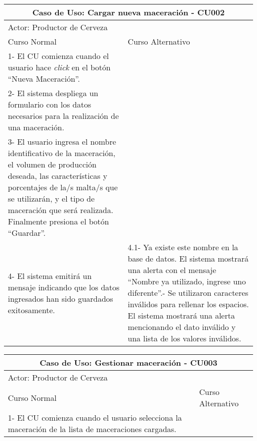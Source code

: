 \begin{minipage}{0.95\textwidth}
    \begin{center}
    \begin{tabularx}{\textwidth}{ | X | X |}
        \hline
        \multicolumn{2}{|c|}{\textbf{Caso de Uso: Cargar nueva maceración - CU002}} \\
        \hline
        \multicolumn{2}{|l|}{Actor: Productor de Cerveza} \\
        \hline
        Curso Normal & Curso Alternativo \\
        \hline
        1- El CU comienza cuando el usuario hace \textit{click} en el botón “Nueva Maceración”. & \\
        \hline
        2- El sistema despliega un formulario con los datos necesarios para la realización de una maceración. &
        \\
        \hline
        3- El usuario ingresa el nombre identificativo de la maceración, el volumen de producción deseada, las características y porcentajes de la/s malta/s que se utilizarán, y el tipo de maceración que será realizada. Finalmente presiona el botón “Guardar”. &
        \\
        \hline
        4- El sistema emitirá un mensaje indicando que los datos ingresados han sido guardados exitosamente.  & 
        4.1- Ya existe este nombre en la base de datos. El sistema mostrará una alerta con el mensaje “Nombre ya utilizado, ingrese uno diferente”.\newline 4.2- Se utilizaron caracteres inválidos para rellenar los espacios. El sistema mostrará una alerta mencionando el dato inválido y una lista de los valores inválidos.
        \\
        \hline
    \end{tabularx}
    \label{CU002}
    \end{center}
    
    \begin{center}
    \begin{tabularx}{\textwidth}{ | X | X |}
        \hline
        \multicolumn{2}{|c|}{\textbf{Caso de Uso: Gestionar maceración - CU003}} \\
        \hline
        \multicolumn{2}{|l|}{Actor: Productor de Cerveza} \\
        \hline
        Curso Normal & Curso Alternativo \\
        \hline
        1- El CU comienza cuando el usuario selecciona la maceración de la lista de maceraciones cargadas. & \\
        \hline
        
    \end{tabularx}
    \label{CU003a}
    \end{center}
    \end{minipage}
    

